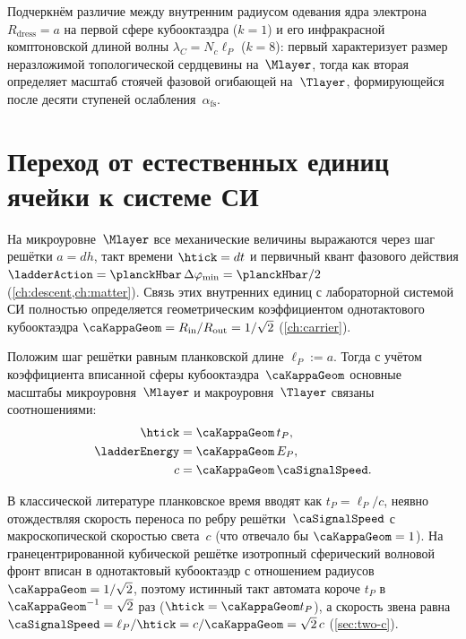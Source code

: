\begin{remark}
Подчеркнём различие между внутренним радиусом одевания ядра электрона $R_{\mathrm{dress}}=a$ на первой сфере кубооктаэдра ($k=1$)
и его инфракрасной комптоновской длиной волны $\lambda_C = N_c \ell_P$ ($k=8$):
первый характеризует размер неразложимой топологической сердцевины на~$\Mlayer$,
тогда как вторая определяет масштаб стоячей фазовой огибающей на~$\Tlayer$, формирующейся после десяти ступеней ослабления~$\alpha_{\mathrm{fs}}$.
\end{remark}

\section{Переход от естественных единиц ячейки к системе СИ}

На микроуровне~$\Mlayer$ все механические величины выражаются через шаг решётки $a = dh$, такт времени $\htick = dt$
и первичный квант фазового действия $\ladderAction = \planckHbar\,\Delta\varphi_{\min} = \planckHbar/2$ (\cref{ch:descent,ch:matter}).
Связь этих внутренних единиц с лабораторной системой СИ полностью определяется геометрическим коэффициентом однотактового кубооктаэдра $\caKappaGeom = R_{\mathrm{in}}/R_{\mathrm{out}} = 1/\sqrt{2}$ (\cref{ch:carrier}).

\begin{definition}
\label{def:si-bridge}
Положим шаг решётки равным планковской длине $\ell_P := a$. Тогда с учётом коэффициента вписанной сферы кубооктаэдра~$\caKappaGeom$ основные масштабы микроуровня~$\Mlayer$ и макроуровня~$\Tlayer$ связаны соотношениями:
\begin{align}
  \htick &= \caKappaGeom\, t_P, \\
  \ladderEnergy &= \caKappaGeom\, E_P, \\
  c &= \caKappaGeom\, \caSignalSpeed.
\end{align}
\end{definition}

В классической литературе планковское время вводят как $t_P = \ell_P / c$, неявно отождествляя скорость переноса по ребру решётки~$\caSignalSpeed$ с макроскопической скоростью света~$c$ (что отвечало бы $\caKappaGeom=1$).
На гранецентрированной кубической решётке изотропный сферический волновой фронт вписан в однотактовый кубооктаэдр с отношением радиусов $\caKappaGeom = 1/\sqrt{2}$,
поэтому истинный такт автомата короче $t_P$ в $\caKappaGeom^{-1}=\sqrt{2}$ раз ($\htick = \caKappaGeom t_P$),
а скорость звена равна $\caSignalSpeed = \ell_P/\htick = c/\caKappaGeom = \sqrt{2}\,c$ (\cref{sec:two-c}).

